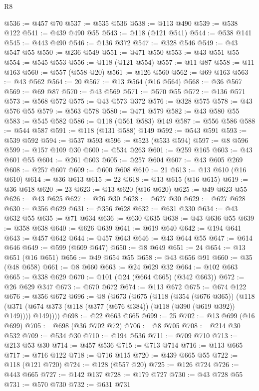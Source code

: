 \begin{lexlean}{R8}
\begin{coremodule}
{{{{{{{{{{{{{{{{{{{{{{{{{{{{{{{{{{{{{{{{{{{{{@536 := @457 @70
@537 := @535 @536
@538 := @113 @490
@539 := @538 @122
@541 := @439 @490 @55
@543 := @118 (@121 @541)
@544 := @538 @141
@545 := @443 @490
@546 := @136 @372
@547 := @328 @546
@549 := @43 @547 @55
@550 := @236 @549
@551 := @471 @550
@553 := @43 @551 @55
@554 := @545 @553
@556 := @118 (@121 @554)
@557 := @11 @87
@558 := @11 @163
@560 := @557 (@558 @20)
@561 := @126 @560
@562 := @69 @163
@563 := @43 @562
@564 := 20
@567 := @13 @564 (@16 @564)
@568 := @36 @567
@569 := @69 @87
@570 := @43 @569
@571 := @570 @55
@572 := @136 @571
@573 := @568 @572
@575 := @43 @573 @372
@576 := @328 @575
@578 := @43 @576 @55
@579 := @563 @578
@580 := @471 @579
@582 := @43 @580 @55
@583 := @545 @582
@586 := @118 (@561 @583) @149
@587 := @556 @586
@588 := @544 @587
@591 := @118 (@131 @588) @149
@592 := @543 @591
@593 := @539 @592
@594 := @537 @593
@596 := @523 (@533 @594)
@597 := @8 @596
@599 := @157 @109 @30
@600 := @534 @263
@601 := @259 @165
@603 := @43 @601 @55
@604 := @261 @603
@605 := @257 @604
@607 := @43 @605 @269
@608 := @257 @607
@609 := @600 @608
@610 := 21
@613 := @13 @610 (@16 @610)
@614 := @36 @613
@615 := 22
@618 := @13 @615 (@16 @615)
@619 := @36 @618
@620 := 23
@623 := @13 @620 (@16 @620)
@625 := @49 @623 @55
@626 := @43 @625
@627 := @26 @30
@628 := @627 @30
@629 := @627 @628
@630 := @356 @629
@631 := @356 @628
@632 := @631 @330
@634 := @43 @632 @55
@635 := @71 @634
@636 := @630 @635
@638 := @43 @636 @55
@639 := @358 @638
@640 := @626 @639
@641 := @619 @640
@642 := @194 @641
@643 := @457 @642
@644 := @457 @643
@646 := @43 @644 @55
@647 := @614 @646
@649 := @599 (@609 @647)
@650 := @8 @649
@651 := 24
@654 := @13 @651 (@16 @651)
@656 := @49 @654 @55
@658 := @43 @656 @91
@660 := @35 (@48 @658)
@661 := @8 @660
@663 := @24 @629 @32
@664 := @102 @663
@665 := @338 @629
@670 := @101 (@24 (@664 @665) (@342 @663))
@672 := @26 @629 @347
@673 := @670 @672
@674 := @113 @672
@675 := @674 @122
@676 := @356 @672
@696 := @8
    (@673
      (@675
        (@118
          (@354 (@676 @365))
          (@118 (@371 (@674 @373 (@118 (@377 (@676 @384)) (@118 (@390 (@619 @392)) @149)))) @149))))
@698 := @22 @663 @665
@699 := 25
@702 := @13 @699 (@16 @699)
@705 := @698 (@36 @702 @72)
@706 := @8 @705
@708 := @214 @30 @532
@709 := @534 @30
@710 := @194 @536
@711 := @709 @710
@713 := @213 @53 @30
@714 := @457 @536
@715 := @713 @714
@716 := @113 @665
@717 := @716 @122
@718 := @716 @115
@720 := @439 @665 @55
@722 := @118 (@121 @720)
@724 := @128 (@557 @20)
@725 := @126 @724
@726 := @443 @665
@727 := @142 @137
@728 := @179 @727
@730 := @43 @728 @55
@731 := @570 @730
@732 := @631 @731
}}}}}}}}}}}}}}}}}}}}}}}}}}}}}}}}}}}}}}}}}}}}}
\end{coremodule}
\end{lexlean}
